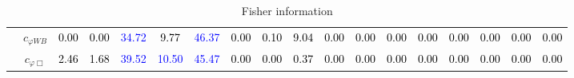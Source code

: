 \documentclass{article}
\begin{document}
\begin{landscape}
\begin{table}[H]
\begin{tabular}{|c|c|c|c|c|c|c|c|c|c|c|c|c|c|c|c|c|c|}
 & $c_{\varphi WB}$ & \textcolor{black}{0.00} & \textcolor{black}{0.00} & \textcolor{blue}{34.72} & \textcolor{black}{9.77} & \textcolor{blue}{46.37} & \textcolor{black}{0.00} & \textcolor{black}{0.10} & \textcolor{black}{9.04} & \textcolor{black}{0.00} & \textcolor{black}{0.00} & \textcolor{black}{0.00} & \textcolor{black}{0.00} & \textcolor{black}{0.00} & \textcolor{black}{0.00} & \textcolor{black}{0.00} & \textcolor{black}{0.00}\\ \cline{2-18}
 & $c_{\varphi \Box}$ & \textcolor{black}{2.46} & \textcolor{black}{1.68} & \textcolor{blue}{39.52} & \textcolor{blue}{10.50} & \textcolor{blue}{45.47} & \textcolor{black}{0.00} & \textcolor{black}{0.00} & \textcolor{black}{0.37} & \textcolor{black}{0.00} & \textcolor{black}{0.00} & \textcolor{black}{0.00} & \textcolor{black}{0.00} & \textcolor{black}{0.00} & \textcolor{black}{0.00} & \textcolor{black}{0.00} & \textcolor{black}{0.00}\\ \hline
\end{tabular}
\caption{Fisher information}
\end{table}
\end{landscape}
\end{document}

